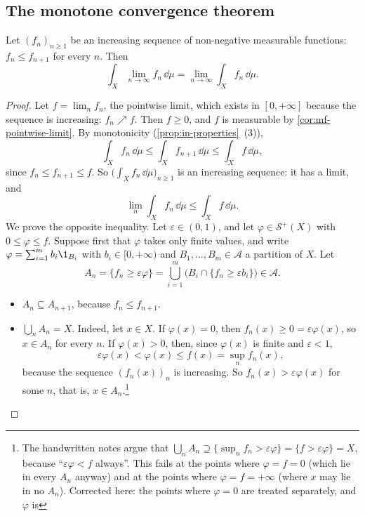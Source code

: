 \subsection{The monotone convergence theorem}\label{sec:in-mct}

\begin{theorem}\label{thm:in-monotone-convergence}
Let $(f_n)_{n\ge1}$ be an increasing sequence of non-negative measurable functions:
$f_n\le f_{n+1}$ for every $n$. Then
\[
  \int_X\lim_{n\to\infty}f_n\,\dd\mu=\lim_{n\to\infty}\int_Xf_n\,\dd\mu .
\]
\end{theorem}

\begin{proof}
Let $f=\lim_nf_n$, the pointwise limit, which exists in $[0,+\infty]$ because the sequence is
increasing: $f_n\nearrow f$. Then $f\ge0$, and $f$ is measurable by \cref{cor:mf-pointwise-limit}.
By monotonicity (\cref{prop:in-properties}~(3)),
\[
  \int_Xf_n\,\dd\mu\le\int_Xf_{n+1}\,\dd\mu\le\int_Xf\,\dd\mu ,
\]
since $f_n\le f_{n+1}\le f$. So $\big(\int_Xf_n\,\dd\mu\big)_{n\ge1}$ is an increasing sequence: it
has a limit, and
\[
  \lim_n\int_Xf_n\,\dd\mu\le\int_Xf\,\dd\mu .
\]
We prove the opposite inequality. Let $\varepsilon\in(0,1)$, and let $\varphi\in\mathcal S^+(X)$
with $0\le\varphi\le f$. Suppose first that $\varphi$ takes only finite values, and write
$\varphi=\sum_{i=1}^mb_i\1_{B_i}$ with $b_i\in[0,+\infty)$ and $B_1,\dots,B_m\in\mathcal A$ a
partition of $X$. Let
\[
  A_n=\{f_n\ge\varepsilon\varphi\}=\bigcup_{i=1}^m\big(B_i\cap\{f_n\ge\varepsilon b_i\}\big)\in\mathcal A .
\]
\begin{itemize}
  \item $A_n\subseteq A_{n+1}$, because $f_n\le f_{n+1}$.
  \item $\bigcup_nA_n=X$. Indeed, let $x\in X$. If $\varphi(x)=0$, then
    $f_n(x)\ge0=\varepsilon\varphi(x)$, so $x\in A_n$ for every $n$. If $\varphi(x)>0$, then,
    since $\varphi(x)$ is finite and $\varepsilon<1$,
    \[
      \varepsilon\varphi(x)<\varphi(x)\le f(x)=\sup_nf_n(x),
    \]
    because the sequence $(f_n(x))_n$ is increasing. So $f_n(x)>\varepsilon\varphi(x)$ for some
    $n$, that is, $x\in A_n$.\footnote{The handwritten notes argue that
    $\bigcup_nA_n\supseteq\{\sup_nf_n>\varepsilon\varphi\}=\{f>\varepsilon\varphi\}=X$, because
    ``$\varepsilon\varphi<f$ always''. This fails at the points where $\varphi=f=0$ (which lie in
    every $A_n$ anyway) and at the points where $\varphi=f=+\infty$ (where $x$ may lie in no
    $A_n$). Corrected here: the points where $\varphi=0$ are treated separately, and $\varphi$ is
}
\end{itemize}
\end{proof}
